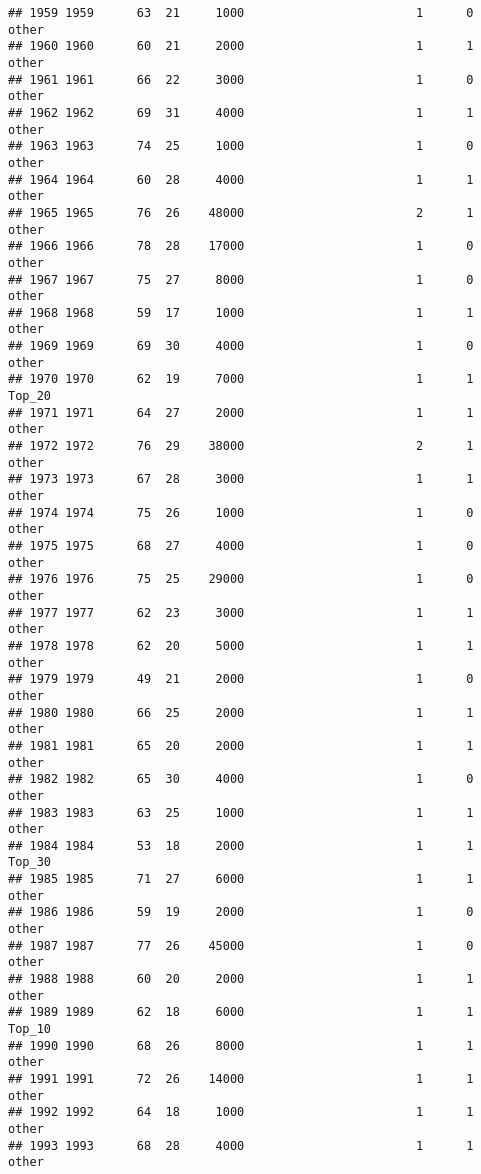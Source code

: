 \documentclass[
]{article}
\begin{document}
\begin{verbatim}
## 1959 1959      63  21     1000                        1      0    other
## 1960 1960      60  21     2000                        1      1    other
## 1961 1961      66  22     3000                        1      0    other
## 1962 1962      69  31     4000                        1      1    other
## 1963 1963      74  25     1000                        1      0    other
## 1964 1964      60  28     4000                        1      1    other
## 1965 1965      76  26    48000                        2      1    other
## 1966 1966      78  28    17000                        1      0    other
## 1967 1967      75  27     8000                        1      0    other
## 1968 1968      59  17     1000                        1      1    other
## 1969 1969      69  30     4000                        1      0    other
## 1970 1970      62  19     7000                        1      1   Top_20
## 1971 1971      64  27     2000                        1      1    other
## 1972 1972      76  29    38000                        2      1    other
## 1973 1973      67  28     3000                        1      1    other
## 1974 1974      75  26     1000                        1      0    other
## 1975 1975      68  27     4000                        1      0    other
## 1976 1976      75  25    29000                        1      0    other
## 1977 1977      62  23     3000                        1      1    other
## 1978 1978      62  20     5000                        1      1    other
## 1979 1979      49  21     2000                        1      0    other
## 1980 1980      66  25     2000                        1      1    other
## 1981 1981      65  20     2000                        1      1    other
## 1982 1982      65  30     4000                        1      0    other
## 1983 1983      63  25     1000                        1      1    other
## 1984 1984      53  18     2000                        1      1   Top_30
## 1985 1985      71  27     6000                        1      1    other
## 1986 1986      59  19     2000                        1      0    other
## 1987 1987      77  26    45000                        1      0    other
## 1988 1988      60  20     2000                        1      1    other
## 1989 1989      62  18     6000                        1      1   Top_10
## 1990 1990      68  26     8000                        1      1    other
## 1991 1991      72  26    14000                        1      1    other
## 1992 1992      64  18     1000                        1      1    other
## 1993 1993      68  28     4000                        1      1    other

\end{verbatim}
\end{document}
